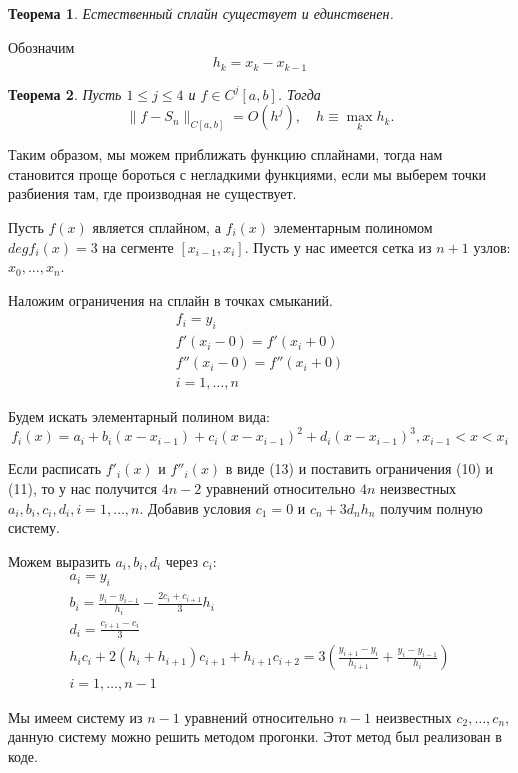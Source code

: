 \documentclass{article}
\newtheorem{theorem}{Теорема}
\begin{document}
\begin{description}
    \begin{theorem}
        Естественный сплайн существует и единственен.
    \end{theorem}

    Обозначим
    \begin{equation}
        h_k = x_k - x_{k-1}
    \end{equation}

    \begin{theorem}
        Пусть \(1 \leq j \leq 4\) и \(f \in C^j[a, b]\). Тогда
        \begin{equation}
            \|f - S_n\|_{C[a, b]} = O(h^j), \quad h \equiv \max_k h_k.
            \label{eq:example}
        \end{equation}
    \end{theorem}

    Таким образом, мы можем приближать функцию сплайнами, тогда нам становится проще бороться с негладкими функциями, если мы выберем точки разбиения там, где производная не существует.
    
    Пусть \(f(x)\) является сплайном, а \(f_i(x)\) элементарным полиномом \(deg f_i(x) = 3\) на сегменте \([x_{i-1}, x_i]\). Пусть у нас имеется сетка из \(n+1\) узлов: \(x_0,\dots,x_n\).
    
    Наложим ограничения на сплайн в точках смыканий.
    \begin{align}
    	f_i = y_i \\
    	f'(x_i-0) = f'(x_i+0) \\
    	f''(x_i-0) = f''(x_i+0) \\
    	i = 1,\dots,n
    \end{align}
    
    Будем искать элементарный полином вида:
    \begin{equation}
    	f_i(x) = a_i + b_i(x - x_{i-1}) + c_i(x - x_{i-1})^2 + d_i(x - x_{i-1})^3, x_{i-1} < x < x_i
    \end{equation}
    
    Если расписать \(f'_i(x)\) и \(f''_i(x)\) в виде (13) и поставить ограничения (10) и (11), то у нас получится \(4n-2\) уравнений относительно \(4n\) неизвестных 
    \(a_i,b_i,c_i,d_i, i = 1,\dots,n\). Добавив условия \(c_1 = 0\) и \(c_n + 3 d_n h_n\) получим полную систему.
    
    Можем выразить \(a_i, b_i, d_i\) через \(c_i\):
    \begin{align}
    	a_i = y_i \\
    	b_i = \frac{y_i - y_{i-1}}{h_i} - \frac{2 c_i + c_{i+1}}{3} h_i \\
    	d_i = \frac{c_{i+1} - c_i}{3} \\
    	h_i c_i + 2(h_i + h_{i+1}) c_{i+1} + h_{i+1} c_{i+2} = 3 (\frac{y_{i+1} - y_i}{h_{i+1}} + \frac{y_i - y_{i-1}}{h_i}) \\
    	i = 1,\dots,n-1
    \end{align}
    
    Мы имеем систему из \(n-1\) уравнений относительно \(n-1\) неизвестных \(c_2,\dots,c_n\), данную систему можно решить методом прогонки. Этот метод был реализован в коде. 
    
\end{description}
\end{document}
